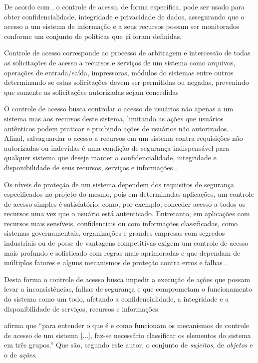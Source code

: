 De acordo com , o controle de acesso, de forma específica, pode ser usado para obter confidencialidade, integridade e privacidade de dados, assegurando que o acesso a um sistema de informação e a seus recursos possam ser monitorados conforme um conjunto de políticas que já foram definidas.	

Controle de acesso corresponde ao processo de arbitragem e intercessão de todas as solicitações de acesso a recursos e serviços de um sistema como arquivos, operações de entrada/saída, impressoras, módulos do sistemas entre outros determinando se estas solicitações devem ser permitidas ou negadas, prevenindo que somente as solicitações autorizadas sejam concedidas \cite{samarati_access_2001} 

O controle de acesso busca controlar o acesso de usuários não apenas a um sistema mas aos recursos deste sistema, limitando as ações que usuários autênticos podem praticar e proibindo ações de usuários não autorizados. \cite{sandhu_access_1994}. Afinal, salvaguardar o acesso a recursos em um sistema contra requisições não autorizadas ou indevidas é uma condição de segurança indispensável para qualquer sistema que deseje manter a confidencialidade, integridade e disponibilidade de seus recursos, serviços e informações \cite{samarati_access_2001}.

Os níveis de proteção de um sistema dependem dos requisitos de segurança especificados no projeto do mesmo, pois em determinadas aplicações, um controle de acesso simples é satisfatório, como, por exemplo, conceder acesso a todos os recursos uma vez que o usuário está autenticado. Entretanto, em aplicações com recursos mais sensíveis, confidenciais ou com informações classificadas, como sistemas governamentais, organizações e grandes empresas com segredos industriais ou de posse de vantagens competitivas exigem um controle de acesso mais profundo e sofisticado com regras mais aprimoradas e que dependam de múltiplos fatores e alguns mecanismos de proteção contra erros e falhas \cite{ferraiolo_policy_2011} \cite{silva_uma_2018}. 

Desta forma o controle de acesso busca impedir a execução de ações que possam levar a inconsistências, falhas de segurança e que comprometam o funcionamento do sistema como um todo, afetando a confidencialidade, a integridade e a disponibilidade de serviços, recursos e informações.  \cite{samarati_access_2001} \cite{sandhu:1996}

 afirma que ``para entender o que é e como funcionam os mecanismos de controle de acesso de um sistema [...], faz-se necessário classificar os elementos do sistema em três grupos.'' Que são, segundo este autor, o conjunto de \textit{sujeitos}, de \textit{objetos} e o de \textit{ações}.


